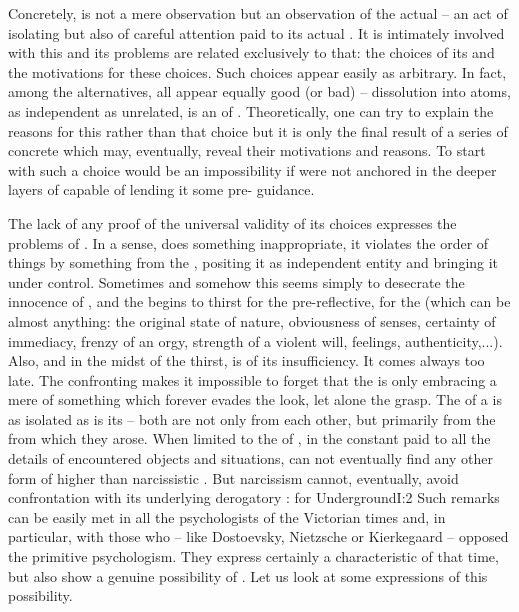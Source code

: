 Concretely,  is not a mere observation  but an
observation of the actual   -- an act of isolating  but also of careful attention paid to its actual . It
is intimately involved with this  and its problems are related
exclusively to that: the choices of its  and the motivations for
these choices.  Such choices appear easily as arbitrary. In fact, among the
 alternatives, all appear equally good (or bad) -- dissolution
into atoms, as independent as unrelated, is an  of .
Theoretically, one can 
try to explain the reasons for this rather than that choice but it is only the
final result of a series of concrete  which may, eventually,
reveal their motivations and reasons. To start with such a choice would be an
impossibility if  were not anchored in the deeper layers of
 capable of lending it some pre- guidance.

The lack of any proof of the universal validity of its choices expresses the
problems of .  In a sense,  does something
inappropriate, it violates the order of things by  something
from the , positing it as independent entity and bringing it under
 control. Sometimes and somehow this seems simply to desecrate
the innocence of , and the  begins to
thirst for the pre-reflective, for the  (which can be almost
anything: the original state of nature, obviousness of senses, certainty of
immediacy, frenzy of an orgy, strength of a violent will, feelings,
authenticity,...). Also, and in the midst of the thirst,  is
 of its insufficiency. It comes always too late.  The confronting
 makes it impossible to forget that the  is
only embracing a mere  of something which forever evades the look, let
alone the grasp. The  of a  is as isolated as is
its  -- both are not only  from each other, but
primarily from the  from which they arose. When limited to the
 of , in the constant  paid
to all the details of encountered objects and situations,  can
not eventually find any other form of higher  than
narcissistic .  But  narcissism cannot,
eventually, avoid confrontation with its underlying derogatory
: for \citet{I swear, gentlemen, that to be too conscious is
  an illness -- a real thorough-going illness.}{Underground}{I:2} Such remarks
can be easily met in all the psychologists of the Victorian times and, in
particular, with those who -- like Dostoevsky, Nietzsche or Kierkegaard --
opposed the primitive psychologism. They express certainly a characteristic of
that time, but also show a genuine possibility of . Let us look
at some expressions of this possibility.

